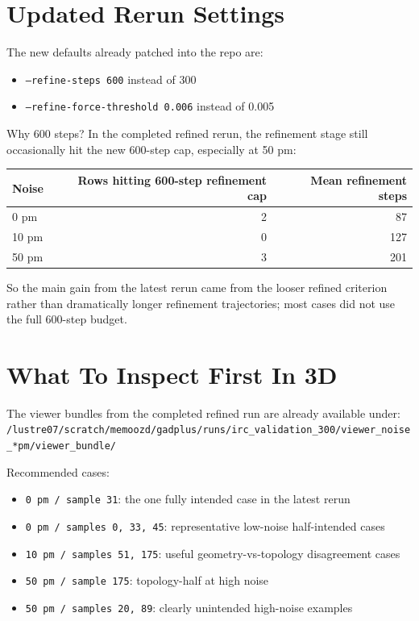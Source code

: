 \documentclass[11pt]{article}
\begin{document}
\section*{Updated Rerun Settings}

The new defaults already patched into the repo are:

\begin{itemize}[nosep,leftmargin=1.5em]
\item \texttt{--refine-steps 600} instead of 300
\item \texttt{--refine-force-threshold 0.006} instead of 0.005
\end{itemize}

Why 600 steps? In the completed refined rerun, the refinement stage still
occasionally hit the new 600-step cap, especially at 50 pm:
\begin{center}
\begin{tabular}{lrr}
\toprule
Noise & Rows hitting 600-step refinement cap & Mean refinement steps \\
\midrule
0 pm  &  2 & 87 \\
10 pm &  0 & 127 \\
50 pm &  3 & 201 \\
\bottomrule
\end{tabular}
\end{center}

So the main gain from the latest rerun came from the looser refined criterion rather
than dramatically longer refinement trajectories; most cases did not use the full
600-step budget.

\section*{What To Inspect First In 3D}

The viewer bundles from the completed refined run are already available under:
\texttt{/lustre07/scratch/memoozd/gadplus/runs/irc\_validation\_300/viewer\_noise\_*pm/viewer\_bundle/}

Recommended cases:
\begin{itemize}[nosep,leftmargin=1.5em]
\item \texttt{0 pm / sample 31}: the one fully intended case in the latest rerun
\item \texttt{0 pm / samples 0, 33, 45}: representative low-noise half-intended cases
\item \texttt{10 pm / samples 51, 175}: useful geometry-vs-topology disagreement cases
\item \texttt{50 pm / sample 175}: topology-half at high noise
\item \texttt{50 pm / samples 20, 89}: clearly unintended high-noise examples
\end{itemize}
\end{document}
